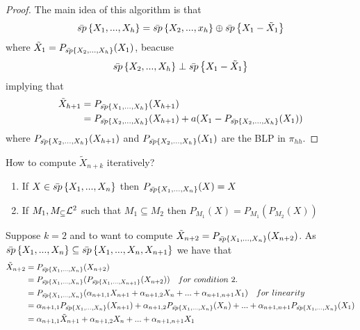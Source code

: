 \begin{proof}
    The main idea of this algorithm is that
    \[
        \bar{sp}\left\{X_1,...,X_h\right\}=\bar{sp}\left\{X_2,...,x_h\right\}\oplus\bar{sp}\left\{X_1-\tilde{X}_1\right\}
    \]
    where $\tilde{X}_1=P_{\bar{sp}\left\{X_2,...,X_h\right\}}(X_1)$, beacuse
    \[
        \bar{sp}\left\{X_2,...,X_h\right\}\perp\bar{sp}\left\{X_1-\tilde{X}_1\right\}  
    \]
    implying that
    \begin{equation*}
        \begin{split}
            \tilde{X}_{h+1}&=P_{\bar{sp}\left\{X_1,...,X_h\right\}}(X_{h+1})\\
            &=P_{\bar{sp}\left\{X_2,...,X_h\right\}}(X_{h+1})+a(X_1-P_{\bar{sp}\left\{X_2,...,X_h\right\}}(X_1))\\
        \end{split}
    \end{equation*}
    where $P_{\bar{sp}\left\{X_2,...,X_h\right\}}(X_{h+1})$ and $P_{\bar{sp}\left\{X_2,...,X_h\right\}}(X_1)$ are the BLP in $\pi_{hh}$.
\end{proof}

How to compute $\tilde{X}_{n+k}$ iteratively?
\begin{enumerate}
    \item If $X\in\bar{sp}\left\{X_1,...,X_n\right\}$ then $P_{\bar{sp}\left\{X_1,...,X_n\right\}}(X)=X$
    \item If $M_1,M_\subseteq\mathcal{L}^{2}$ such that $M_1\subseteq M_2$ then $P_{M_1}(X)=P_{M_1}(P_{M_2}(X))$
\end{enumerate}

Suppose $k=2$ and to want to compute $\tilde{X}_{n+2}=P_{\bar{sp}\left\{X_1,...,X_n\right\}}(X_{n+2})$. As $\bar{sp}\left\{X_1,...,X_n\right\}\subseteq\bar{sp}\left\{X_1,...,X_n,X_{n+1}\right\}$ we have that
\begin{equation*}
    \begin{split}
        \tilde{X}_{n+2}&=P_{\mean{sp}\set{X_1,...,X_n}}(X_{n+2})\\
        &=P_{\mean{sp}\set{X_1,...,X_n}}(P_{\mean{sp}\set{X_1,...,X_{n+1}}}(X_{n+2}))\ \ \ for\ condition\ 2.\\
        &=P_{\mean{sp}\set{X_1,...,X_n}}(\alpha_{n+1,1}X_{n+1}+\alpha_{n+1,2}X_n+...+\alpha_{n+1,n+1}X_1)\ \ \ for\ linearity\\
        &=\alpha_{n+1,1}P_{\mean{sp}\set{X_1,...,X_n}}(X_{n+1})+\alpha_{n+1,2}P_{\mean{sp}\set{X_1,...,X_n}}(X_n)+...+\alpha_{n+1,n+1}P_{\mean{sp}\set{X_1,...,X_n}}(X_1)\\
        &=\alpha_{n+1,1}\tilde{X}_{n+1}+\alpha_{n+1,2}X_n+...+\alpha_{n+1,n+1}X_1\\
    \end{split}
\end{equation*}

